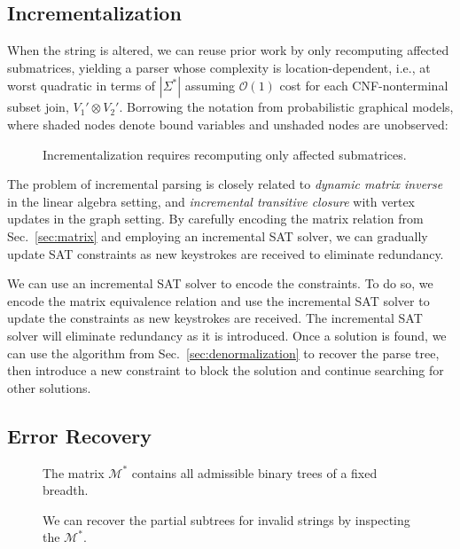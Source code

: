 \documentclass[sigplan,review,anonymous,acmsmall]{acmart}\settopmatter{printfolios=false,printccs=false,printacmref=false}
\begin{document}
\subsection{Incrementalization}\label{sec:incrementalization}

When the string is altered, we can reuse prior work by only recomputing affected submatrices, yielding a parser whose complexity is location-dependent, i.e., at worst quadratic in terms of $|\Sigma^*|$ assuming $\mathcal{O}(1)$ cost for each CNF-nonterminal subset join, $V_1'\otimes V_2'$. Borrowing the notation from probabilistic graphical models, where shaded nodes denote bound variables and unshaded nodes are unobserved:

\begin{figure}
  \resizebox{.4\textwidth}{!}{}
  \caption{Incrementalization requires recomputing only affected submatrices.}
\end{figure}

The problem of incremental parsing is closely related to \textit{dynamic matrix inverse} in the linear algebra setting, and \textit{incremental transitive closure} with vertex updates in the graph setting. By carefully encoding the matrix relation from Sec.~\ref{sec:matrix} and employing an incremental SAT solver, we can gradually update SAT constraints as new keystrokes are received to eliminate redundancy.

We can use an incremental SAT solver to encode the constraints. To do so, we encode the matrix equivalence relation and use the incremental SAT solver to update the constraints as new keystrokes are received. The incremental SAT solver will eliminate redundancy as it is introduced. Once a solution is found, we can use the algorithm from Sec.~\ref{sec:denormalization} to recover the parse tree, then introduce a new constraint to block the solution and continue searching for other solutions.

\pagebreak\subsection{Error Recovery}\label{sec:error}

\begin{figure}
  \vspace{-20pt}
  \resizebox{0.4\textwidth}{!}{}
  \caption{The matrix $\mathcal{M}^*$ contains all admissible binary trees of a fixed breadth.}\label{fig:binary_trees}
  \begin{center}
  \resizebox{.35\textwidth}{!}{}
  \end{center}
  \caption{We can recover the partial subtrees for invalid strings by inspecting the $\mathcal{M}^*$.}\label{fig:peaks}
\end{figure}
\end{document}
